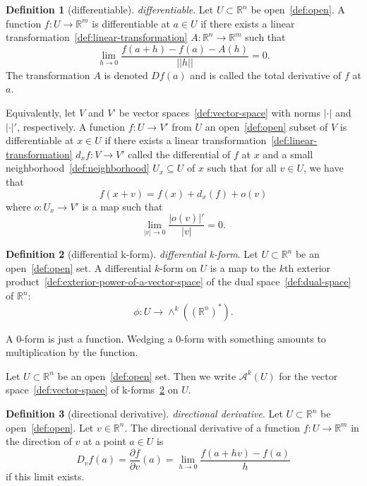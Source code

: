 \documentclass[12pt,a4paper]{article}
\theoremstyle{definition}
\newtheorem{definition}{Definition}
\begin{document}
\begin{definition}[differentiable]\label{def:differentiable}
\emph{differentiable}. Let $U \subset \mathbb R^n$ be open~\ref{def:open}. A function $f: U\to \mathbb R^m$ is differentiable at $a \in U$ if there exists a linear transformation~\ref{def:linear-transformation} $A:\mathbb R^n \to \mathbb R^m$ such that $$\lim_{h\to 0} \frac{f(a+h)-f(a)-A(h)}{\vert \vert h\vert \vert } = 0.$$ The transformation $A$ is denoted $Df(a)$ and is called the total derivative of $f$ at $a$.

Equivalently, let $V$ and $V$' be vector spaces~\ref{def:vector-space} with norms $\vert \cdot\vert $ and $\vert \cdot\vert '$, respectively. A function $f:U\to V'$ from $U$ an open~\ref{def:open} subset of $V$ is differentiable at $x\in U$ if there exists a linear transformation~\ref{def:linear-transformation} $d_x f :V\to V'$ called the differential of $f$ at $x$ and a small neighborhood~\ref{def:neighborhood} $U_x\subseteq U$ of $x$ such that for all $v\in U$, we have that $$f(x+v) = f(x) + d_x(f) + o(v)$$ where $o: U_x\to V'$ is a map such that $$\lim_{\vert v\vert \to 0} \frac{\vert o(v)\vert '}{\vert v\vert } = 0.$$
\end{definition}

\begin{definition}[differential k-form]\label{def:differential-k-form}
\emph{differential k-form}. Let $U\subset\mathbb R^n$ be an open~\ref{def:open} set. A differential $k$-form on $U$ is a map to the $k$th exterior product~\ref{def:exterior-power-of-a-vector-space} of the dual space~\ref{def:dual-space} of $\mathbb R^n$: $$\phi:U\to\wedge^k((\mathbb R^n)^*).$$

A $0$-form is just a function. Wedging a $0$-form with something amounts to multiplication by the function.

Let $U\subset\mathbb R^n$ be an open~\ref{def:open} set. Then we write $\mathcal A^k(U)$ for the vector space~\ref{def:vector-space} of k-forms~\ref{def:differential-k-form} on $U$.
\end{definition}

\begin{definition}[directional derivative]\label{def:directional-derivative}
\emph{directional derivative}. Let $U \subset \mathbb R^n$ be open~\ref{def:open}. Let $v \in \mathbb R^n$. The directional derivative of a function $f:U\to\mathbb R^m$ in the direction of $v$ at a point $a \in U$ is $$D_vf(a) = \frac{\partial f}{\partial v}(a) = \lim_{h\to 0}\frac{f(a+hv)-f(a)}{h}$$ if this limit exists.
\end{definition}
\end{document}
